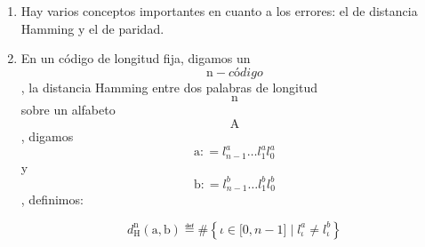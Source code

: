 \documentclass[
]{article}
\begin{document}
\begin{enumerate}
\begin{enumerate}
\begin{enumerate}
\begin{enumerate}
      \item
        La probabilidad de error sobre un valor 0 o un valor 1 ha de ser
        muy parecida, de forma que la asimetría sea inapreciable.
      \end{enumerate}
    \item
      Hay varios conceptos importantes en cuanto a los errores: el de
      distancia Hamming y el de paridad.
    \item
      En un código de longitud fija, digamos un
      \[\mathtt{\mathrm{n}} - \mathit{código}\], la distancia Hamming
      en\-tre dos palabras de longitud \[\mathtt{\mathrm{n}}\] sobre un
      alfabeto \[\mathtt{\mathrm{A}}\], digamos
      \[\mathtt{\mathrm{a}}{: = l_{n - 1}^{a}}\ldots l_{1}^{a}l_{0}^{a}\]y
      \[\mathtt{\mathrm{b}}{: = l_{n - 1}^{b}}\ldots l_{1}^{b}l_{0}^{b}\],
      definimos:

      \[d_{\mathtt{\mathrm{H}}}^{\mathtt{\mathrm{n}}}\left( \mathtt{\mathrm{a,b}} \right) ≝ \#\left\{ {{\iota \in {\lbrack{0,{n - 1}}\rbrack}} \mid {l_{\iota}^{a} \neq l_{\iota}^{b}}} \right\}\]


\end{enumerate}
\end{enumerate}
\end{enumerate}
\end{document}
